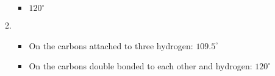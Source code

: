 \documentclass[12pt]{article}
\begin{document}
\begin{enumerate}
\begin{enumerate}
\begin{itemize}
          \item $120^{\circ}$

        \end{itemize}

      \item {}

        \begin{itemize}

          \item On the carbons attached to three hydrogen: $109.5^{\circ}$

          \item On the carbons double bonded to each other and hydrogen: $120^{\circ}$

        \end{itemize}

    \end{enumerate}

\end{enumerate}
\end{document}
